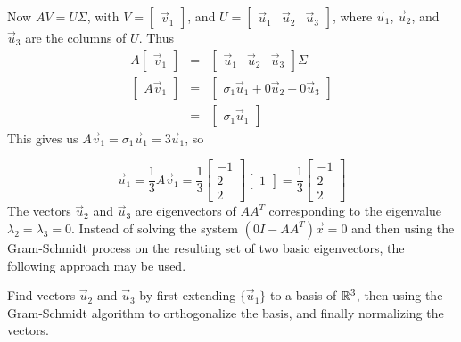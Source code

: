 \documentclass{ximera}
\begin{document}
\begin{example}
\begin{explanation}
\noindent Now $AV=U\Sigma$, with
$V=\left[\begin{array}{r}\vec{v}_1 \end{array}\right]$,
and $U=\left[\begin{array}{rrr} \vec{u}_1 & \vec{u}_2 & \vec{u}_3 \end{array}\right]$,
where $\vec{u}_1$, $\vec{u}_2$, and $\vec{u}_3$ are the columns of $U$.
Thus
\begin{eqnarray*}
A\left[\begin{array}{r} \vec{v}_1 \end{array}\right]
&=& \left[\begin{array}{rrr} \vec{u}_1 & \vec{u}_2 & \vec{u}_3 \end{array}\right]\Sigma\\
\left[\begin{array}{r} A\vec{v}_1 \end{array}\right]
&=& \left[\begin{array}{r} \sigma_1 \vec{u}_1+0\vec{u}_2+0\vec{u}_3 \end{array}\right]\\
&=& \left[\begin{array}{r} \sigma_1 \vec{u}_1 \end{array}\right]
\end{eqnarray*}
This gives us $A\vec{v}_1=\sigma_1 \vec{u}_1= 3\vec{u}_1$, so

\[ \vec{u}_1 = \frac{1}{3}A\vec{v}_1
= \frac{1}{3}
\left[\begin{array}{r} -1 \\ 2 \\ 2 \end{array}\right]
\left[\begin{array}{r} 1 \end{array}\right]
= \frac{1}{3}
\left[\begin{array}{r} -1 \\ 2 \\ 2 \end{array}\right]\]
The vectors $\vec{u}_2$ and $\vec{u}_3$ are eigenvectors of $AA^T$ corresponding
to the eigenvalue $\lambda_2=\lambda_3=0$.
Instead of solving the system $(0I-AA^T)\vec{x}= 0$ and then using the
Gram-Schmidt process on the resulting set of
two basic eigenvectors, the following approach may be used.


Find vectors $\vec{u}_2$ and $\vec{u}_3$ by first extending $\{ \vec{u}_1\}$ to a basis of
$\mathbb{R}^3$, then using the Gram-Schmidt algorithm to orthogonalize the basis,
and finally normalizing the vectors.


\end{explanation}
\end{example}
\end{document}
